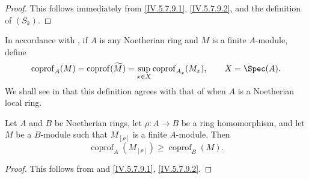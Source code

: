 
\begin{proof}
This follows immediately from \eqref{IV.5.7.9.1},
\eqref{IV.5.7.9.2}, and the definition of $(S_k)$.
\end{proof}

\begin{env}[5.7.12]
\label{IV.5.7.12}
In accordance with , if $A$ is any Noetherian ring
and $M$ is a finite $A$-module, define
\[
\operatorname{coprof}_A(M)
 =\operatorname{coprof}(\widetilde M)
 =\sup_{x\in X}\operatorname{coprof}_{A_x}(M_x),
\qquad X=\Spec(A).
\]
We shall see in  that this definition agrees with
that of  when $A$ is a Noetherian local ring.
\end{env}

\begin{corollary}[5.7.13]
\label{IV.5.7.13}
Let $A$ and $B$ be Noetherian rings, let $\rho:A\to B$ be a ring
homomorphism, and let $M$ be a $B$-module such that $M_{[\rho]}$ is
a finite $A$-module.  Then
\begin{equation}
\operatorname{coprof}_A(M_{[\rho]})
 \geq \operatorname{coprof}_B(M).
\tag{5.7.13.1}\label{IV.5.7.13.1}
\end{equation}
\end{corollary}

\begin{proof}
This follows from  and
\eqref{IV.5.7.9.1}, \eqref{IV.5.7.9.2}.
\end{proof}

